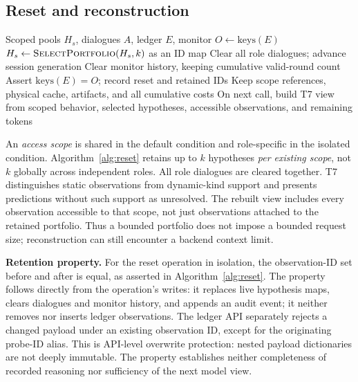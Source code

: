 \documentclass[letterpaper,journal]{IEEEtran}
\begin{document}
\subsection{Reset and reconstruction}\label{sec:reset}
\begin{algorithm}[t]
\caption{Evidence-preserving reset (canonical Algorithm 4)}\label{alg:reset}
\begin{algorithmic}[1]\small
\Require Scoped pools $H_s$, dialogues $A$, ledger $E$, monitor
\State $O\gets\mathrm{keys}(E)$
    \State $H_s\gets\textsc{SelectPortfolio}(H_s,k)$ as an ID map
  \EndIf
\EndFor
\State Clear all role dialogues; advance session generation
\State Clear monitor history, keeping cumulative valid-round count
\State Assert $\mathrm{keys}(E)=O$; record reset and retained IDs
\State Keep scope references, physical cache, artifacts, and all cumulative costs
\State On next call, build T7 view from scoped behavior, selected hypotheses, accessible observations, and remaining tokens
\end{algorithmic}
\end{algorithm}

An \emph{access scope} is shared in the default condition and role-specific in the isolated condition. Algorithm~\ref{alg:reset} retains up to $k$ hypotheses \emph{per existing scope}, not $k$ globally across independent roles. All role dialogues are cleared together. T7 distinguishes static observations from dynamic-kind support and presents predictions without such support as unresolved. The rebuilt view includes every observation accessible to that scope, not just observations attached to the retained portfolio. Thus a bounded portfolio does not impose a bounded request size; reconstruction can still encounter a backend context limit.

\textbf{Retention property.} For the reset operation in isolation, the observation-ID set before and after is equal, as asserted in Algorithm~\ref{alg:reset}. The property follows directly from the operation's writes: it replaces live hypothesis maps, clears dialogues and monitor history, and appends an audit event; it neither removes nor inserts ledger observations. The ledger API separately rejects a changed payload under an existing observation ID, except for the originating probe-ID alias. This is API-level overwrite protection: nested payload dictionaries are not deeply immutable. The property establishes neither completeness of recorded reasoning nor sufficiency of the next model view.
\end{document}
